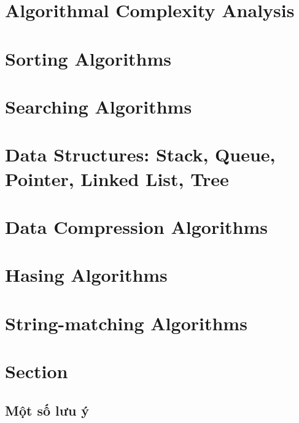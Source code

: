 \newpage
\section{Algorithmal Complexity Analysis}
\section{Sorting Algorithms}
\section{Searching Algorithms}
\section{Data Structures: Stack, Queue, Pointer, Linked List, Tree}
\section{Data Compression Algorithms}
\section{Hasing Algorithms}
\section{String-matching Algorithms}






































\newpage
\section{Section}

\subsection{Một số lưu ý}

